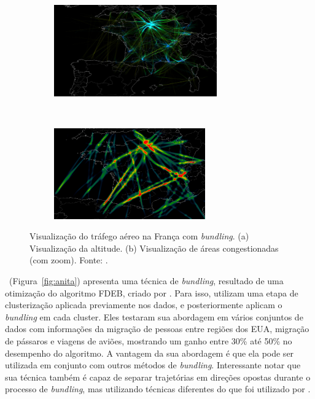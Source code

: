 \begin{figure}[ht!]
  \centering
  \begin{subfigure}[t]{0.45\textwidth}
    \centering
    \includegraphics[width=70mm]{../figuras/air-traffic.png}
    \caption{}
  \end{subfigure}
  ~
  \begin{subfigure}[t]{0.45\textwidth}
    \centering
    \includegraphics[width=65mm]{../figuras/klein.png}
    \caption{}
  \end{subfigure}

  \caption[Visualização do tráfego aéreo na França com
\emph{bundling}]{Visualização do tráfego aéreo na França com \emph{bundling}.
(a) Visualização da altitude. (b) Visualização de áreas congestionadas (com zoom). Fonte:
\citet{Klein2014}. \label{fig:klein}}
\end{figure}

\citet{Anita2017}~(Figura~\ref{fig:anita}) apresenta uma técnica de \emph{bundling}, resultado de uma
otimização do algoritmo FDEB, criado por \citet{Selassie2011}. Para isso,
utilizam uma etapa de clusterização aplicada previamente nos dados, e
posteriormente aplicam o \emph{bundling} em cada cluster. Eles testaram sua
abordagem em vários conjuntos de dados com informações da migração de pessoas
entre regiões dos EUA, migração de pássaros e viagens de aviões, mostrando um
ganho entre 30\% até 50\% no desempenho do algoritmo. A vantagem da sua
abordagem é que ela pode ser utilizada em conjunto com outros métodos de
\emph{bundling}. Interessante notar que sua técnica também é capaz de separar
trajetórias em direções opostas durante o processo de \emph{bundling}, mas
utilizando técnicas diferentes do que foi utilizado por \citet{adeb}.


